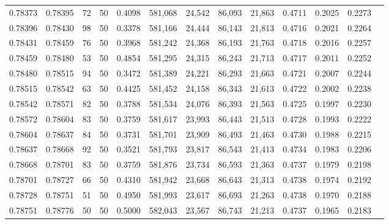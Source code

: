 \begin{tabular}{rrrrrrrrrrrrr}
0.78373 & 0.78395 &    72 &  50 &                                     0.4098 & 581,068 &  24,542 &  86,093 &  21,863 & 0.4711 & 0.2025 & 0.2273 \\
0.78396 & 0.78430 &    98 &  50 &                                     0.3378 & 581,166 &  24,444 &  86,143 &  21,813 & 0.4716 & 0.2021 & 0.2264 \\
0.78431 & 0.78459 &    76 &  50 &                                     0.3968 & 581,242 &  24,368 &  86,193 &  21,763 & 0.4718 & 0.2016 & 0.2257 \\
0.78459 & 0.78480 &    53 &  50 &                                     0.4854 & 581,295 &  24,315 &  86,243 &  21,713 & 0.4717 & 0.2011 & 0.2252 \\
0.78480 & 0.78515 &    94 &  50 &                                     0.3472 & 581,389 &  24,221 &  86,293 &  21,663 & 0.4721 & 0.2007 & 0.2244 \\
0.78515 & 0.78542 &    63 &  50 &                                     0.4425 & 581,452 &  24,158 &  86,343 &  21,613 & 0.4722 & 0.2002 & 0.2238 \\
0.78542 & 0.78571 &    82 &  50 &                                     0.3788 & 581,534 &  24,076 &  86,393 &  21,563 & 0.4725 & 0.1997 & 0.2230 \\
0.78572 & 0.78604 &    83 &  50 &                                     0.3759 & 581,617 &  23,993 &  86,443 &  21,513 & 0.4728 & 0.1993 & 0.2222 \\
0.78604 & 0.78637 &    84 &  50 &                                     0.3731 & 581,701 &  23,909 &  86,493 &  21,463 & 0.4730 & 0.1988 & 0.2215 \\
0.78637 & 0.78668 &    92 &  50 &                                     0.3521 & 581,793 &  23,817 &  86,543 &  21,413 & 0.4734 & 0.1983 & 0.2206 \\
0.78668 & 0.78701 &    83 &  50 &                                     0.3759 & 581,876 &  23,734 &  86,593 &  21,363 & 0.4737 & 0.1979 & 0.2198 \\
0.78701 & 0.78727 &    66 &  50 &                                     0.4310 & 581,942 &  23,668 &  86,643 &  21,313 & 0.4738 & 0.1974 & 0.2192 \\
0.78728 & 0.78751 &    51 &  50 &                                     0.4950 & 581,993 &  23,617 &  86,693 &  21,263 & 0.4738 & 0.1970 & 0.2188 \\
0.78751 & 0.78776 &    50 &  50 &                                     0.5000 & 582,043 &  23,567 &  86,743 &  21,213 & 0.4737 & 0.1965 & 0.2183 \\

\end{tabular}
